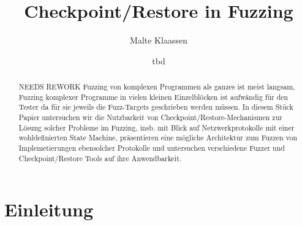 \documentclass[12pt]{scrartcl}
\begin{document}
\author{Malte Klaassen}
\date{tbd}
\title{Checkpoint/Restore in Fuzzing}

\maketitle

\begin{abstract}
    NEEDS REWORK Fuzzing von komplexen Programmen als ganzes ist meist langsam, Fuzzing komplexer Programme in vielen kleinen Einzelblöcken ist aufwändig für den Tester da für sie jeweils die Fuzz-Targets geschrieben werden müssen. In diesem Stück Papier untersuchen wir die Nutzbarkeit von Checkpoint/Restore-Mechanismen zur Lösung solcher Probleme im Fuzzing, insb. mit Blick auf Netzwerkprotokolle mit einer wohldefinierten State Machine, präsentieren eine mögliche Architektur zum Fuzzen von Implemetierungen ebensolcher Protokolle und untersuchen verschiedene Fuzzer und Checkpoint/Restore Tools auf ihre Anwendbarkeit.
\end{abstract}

\tableofcontents

\section{Einleitung}
\end{document}
